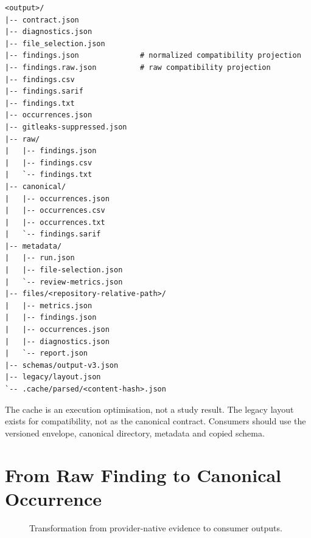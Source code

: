 \begin{lstlisting}[basicstyle=\ttfamily\footnotesize]
<output>/
|-- contract.json
|-- diagnostics.json
|-- file_selection.json
|-- findings.json              # normalized compatibility projection
|-- findings.raw.json          # raw compatibility projection
|-- findings.csv
|-- findings.sarif
|-- findings.txt
|-- occurrences.json
|-- gitleaks-suppressed.json
|-- raw/
|   |-- findings.json
|   |-- findings.csv
|   `-- findings.txt
|-- canonical/
|   |-- occurrences.json
|   |-- occurrences.csv
|   |-- occurrences.txt
|   `-- findings.sarif
|-- metadata/
|   |-- run.json
|   |-- file-selection.json
|   `-- review-metrics.json
|-- files/<repository-relative-path>/
|   |-- metrics.json
|   |-- findings.json
|   |-- occurrences.json
|   |-- diagnostics.json
|   `-- report.json
|-- schemas/output-v3.json
|-- legacy/layout.json
`-- .cache/parsed/<content-hash>.json
\end{lstlisting}

The cache is an execution optimisation, not a study result. The legacy layout
exists for compatibility, not as the canonical contract. Consumers should use
the versioned envelope, canonical directory, metadata and copied schema.

\section{From Raw Finding to Canonical Occurrence}
\begin{figure}[H]
\centering
{}
\caption{Transformation from provider-native evidence to consumer outputs.}
\end{figure}

